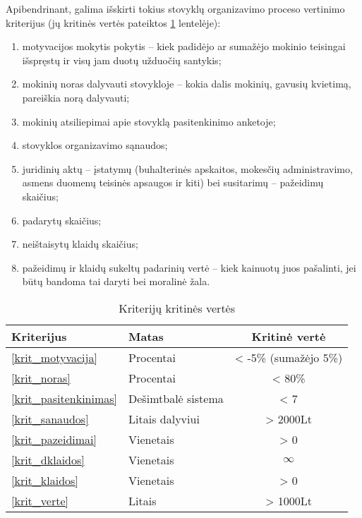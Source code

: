 Apibendrinant, galima išskirti tokius stovyklų organizavimo proceso 
vertinimo kriterijus (jų kritinės vertės pateiktos \ref{tab:krit}
lentelėje):
\begin{enumerate}
  \item \label{krit_motyvacija}
    motyvacijos mokytis pokytis – kiek padidėjo
    ar sumažėjo mokinio teisingai išspręstų ir visų jam duotų užduočių
    santykis; 
  \item \label{krit_noras}
    mokinių noras dalyvauti stovykloje – kokia 
    dalis mokinių, gavusių kvietimą, pareiškia norą dalyvauti;
  \item \label{krit_pasitenkinimas}
    mokinių atsiliepimai apie stovyklą pasitenkinimo anketoje;
  \item \label{krit_sanaudos}
    stovyklos organizavimo sąnaudos;
  \item \label{krit_pazeidimai}
    juridinių aktų – įstatymų (buhalterinės apskaitos,
    mokesčių administravimo, asmens duomenų teisinės apsaugos
    ir kiti) bei susitarimų – pažeidimų skaičius;
  \item \label{krit_dklaidos}
    padarytų \glsdarbkldgsk {} skaičius;
  \item \label{krit_klaidos}
    neištaisytų klaidų skaičius;
  \item \label{krit_verte}
    pažeidimų  ir klaidų sukeltų padarinių vertė – kiek kainuotų juos 
    pašalinti, jei būtų bandoma tai daryti bei moralinė žala.

\end{enumerate}

\begin{table}[h!]
  \centering
  \begin{tabular}[]{| l | l | c |}
    \hline
    Kriterijus & Matas & Kritinė vertė \\
    \hline
    \ref{krit_motyvacija} & Procentai & < -5\% (sumažėjo 5\%) \\
    \hline
    \ref{krit_noras} & Procentai & < 80\% \\
    \hline
    \ref{krit_pasitenkinimas} & Dešimtbalė sistema & < 7 \\
    \hline
    \ref{krit_sanaudos} & Litais dalyviui & > 2000Lt \\
    \hline
    \ref{krit_pazeidimai} & Vienetais & > 0 \\
    \hline
    \ref{krit_dklaidos} & Vienetais & 
    $\infty$\footnotemark[1]\\
    \hline
    \ref{krit_klaidos} & Vienetais & > 0 \\ 
    \hline
    \ref{krit_verte} & Litais & > 1000Lt \\
    \hline
  \end{tabular}
  \caption{Kriterijų kritinės vertės}
  \label{tab:krit}
\end{table}

